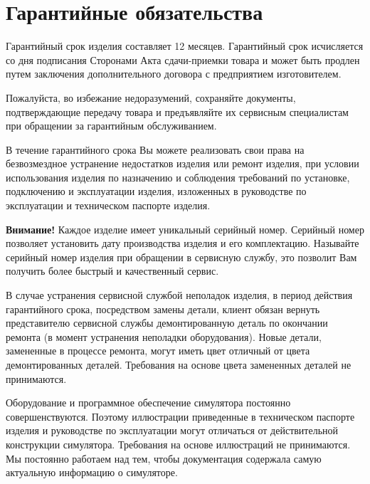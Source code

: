\ifIsLngRus  %
{
    \section{Гарантийные обязательства}

    Гарантийный срок изделия составляет 12 месяцев. 
    Гарантийный срок исчисляется со дня подписания Сторонами Акта сдачи-приемки товара 
    и может быть продлен путем заключения дополнительного договора с предприятием изготовителем.
    
    Пожалуйста, во избежание недоразумений, сохраняйте документы, подтверждающие передачу товара 
    и предъявляйте их сервисным специалистам при обращении за гарантийным обслуживанием.
    
    В течение гарантийного срока Вы можете реализовать свои права на безвозмездное устранение
    недостатков изделия или ремонт изделия, при условии использования изделия по назначению и
    соблюдения требований по установке, подключению и эксплуатации изделия, 
    изложенных в руководстве по эксплуатации и техническом паспорте изделия.
    
    {\textcolor[rgb]{1,0,0}{\textbf{Внимание!}}} Каждое изделие имеет уникальный серийный номер. Серийный номер позволяет
    установить дату производства изделия и его комплектацию. Называйте серийный номер изделия
    при обращении в сервисную службу, это позволит Вам получить более быстрый и качественный сервис.
    
    В случае устранения сервисной службой неполадок изделия, в период действия гарантийного срока,
    посредством замены детали, клиент обязан вернуть представителю сервисной службы 
    демонтированную деталь по окончании ремонта (в момент устранения неполадки оборудования).
    Новые детали, замененные в процессе ремонта, могут иметь цвет отличный от цвета демонтированных деталей.
    Требования на основе цвета замененных деталей не принимаются.

    Оборудование и программное обеспечение симулятора постоянно совершенствуются. 
    Поэтому иллюстрации приведенные в техническом паспорте изделия и руководстве по эксплуатации могут отличаться от действительной конструкции симулятора. Требования на основе иллюстраций не принимаются.
    Мы постоянно работаем над тем, чтобы документация содержала самую актуальную информацию о симуляторе.
    
}
